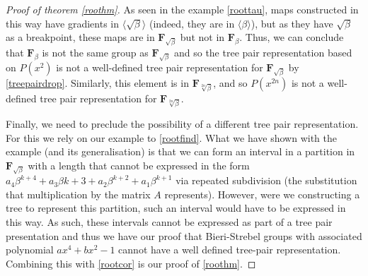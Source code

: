 \documentclass[10pt,a4paper]{amsart}
\newcommand{\FN}[1]{$\textbf{F}_{#1}$}
\begin{document}
\begin{proof}[Proof of theorem \ref{roothm}]
As seen in the example \ref{roottau}, maps constructed in this way have gradients  in $\langle \sqrt{\beta} \rangle$ (indeed, they are in $\langle \beta \rangle$), but as they have $\sqrt{\beta}$ as a breakpoint, these maps are in \FN{\sqrt{\beta}} but not in \FN{\beta}. Thus, we can conclude that \FN{\beta} is not the same group as \FN{\sqrt{\beta}} and so the tree pair representation based on $P(x^2)$ is not a well-defined tree pair representation for \FN{\sqrt{\beta}} by \ref{treepairdrop}. Similarly, this element is in \FN{\sqrt[2n]{\beta}}, and so $P(x^{2n})$ is not a well-defined tree pair representation for \FN{\sqrt[2n]{\beta}}.
\par
Finally, we need to preclude the possibility of a different tree pair representation. For this we rely on our example to \ref{rootfind}. What we have shown with the example (and its generalisation) is that we can form an interval in a partition in \FN{\sqrt{\beta}} with a length that cannot be expressed in the form $a_4 \beta^{k+4} + a_3 \beta{k+3} + a_2 \beta^{k+2} + a_1 \beta^{k+1}$ via repeated subdivision (the substitution that multiplication by the matrix $A$ represents). However, were we constructing a tree to represent this partition, such an interval would have to be expressed in this way. As such, these intervals cannot be expressed as part of a tree pair presentation and thus we have our proof that Bieri-Strebel groups with associated polynomial $ax^4+bx^2-1$ cannot have a well defined tree-pair representation. Combining this with \ref{rootcor} is our proof of \ref{roothm}.

\end{proof}
\end{document}
